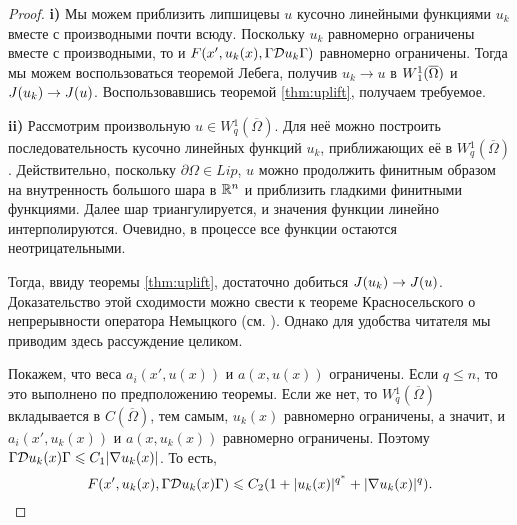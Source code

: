 \begin{proof}
\textbf{\textup{i)}} Мы можем приблизить липшицевы $u$ кусочно линейными функциями $u_k$ вместе с производными почти всюду.
Поскольку $u_k$ равномерно ограничены вместе с производными,
то и $F(x', u_k(x), \norm{\mathcal{D} u_k})$ равномерно ограничены.
Тогда мы можем воспользоваться теоремой Лебега, получив $u_k \to u$ в $\W(\overline{\Omega})$ и $J( u_k ) \to J( u )$.
Воспользовавшись теоремой \ref{thm:uplift}, получаем требуемое.

\textbf{\textup{ii)}} Рассмотрим произвольную $u \in W{}^1_q(\overline{\Omega})$.
Для неё можно построить последовательность кусочно линейных функций $u_k$, приближающих её в $W{}^1_q(\overline{\Omega})$.
Действительно, поскольку $\partial \Omega \in Lip$,
$u$ можно продолжить финитным образом на внутренность большого шара в $\mathbb R^n$
и приблизить гладкими финитными функциями.
Далее шар триангулируется, и значения функции линейно интерполируются.
Очевидно, в процессе все функции остаются неотрицательными.

Тогда, ввиду теоремы \ref{thm:uplift}, достаточно добиться $J( u_k ) \to J( u )$.
Доказательство этой сходимости можно свести к теореме Красносельского о непрерывности
оператора Немыцкого (см. \cite[гл. 5, ]{Krasnoselsky}).
Однако для удобства читателя мы приводим здесь рассуждение целиком.

Покажем, что веса $a_i(x', u(x))$ и $a(x, u(x))$ ограничены.
Если $q \le n$, то это выполнено по предположению теоремы. Если же нет, то $W{}^1_q(\overline{\Omega})$ вкладывается в $C(\overline{\Omega})$,
тем самым, $u_k(x)$ равномерно ограничены, а значит, и $a_i(x', u_k(x))$ и $a(x, u_k(x))$ равномерно ограничены.
Поэтому $\norm{ \mathcal{D} u_k( x ) } \le C_1 |\nabla u_k( x )|$.
То есть,
$$F( x', u_k( x ), \norm{ \mathcal{D} u_k( x ) } ) \le C_2 ( 1 + |u_k( x )|^{q^*} + |\nabla u_k( x )|^q ).$$



\end{proof}
